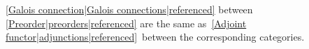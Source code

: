 
\ref{Galois connection|Galois connections|referenced} between \ref{Preorder|preorders|referenced} are the same as \,\ref{Adjoint functor|adjunctions|referenced}\, between the corresponding categories.
